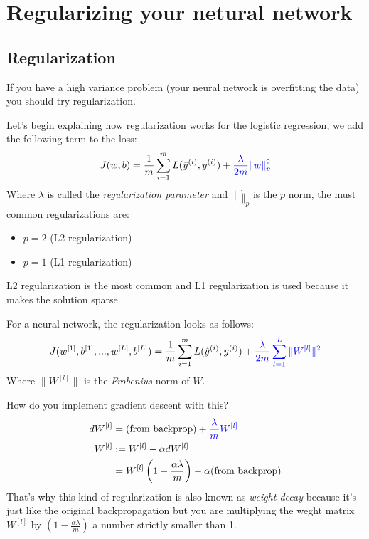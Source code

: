 \section*{Regularizing your netural network}
\subsection*{Regularization}

If you have a high variance problem (your neural network is overfitting the data) you 
should try regularization.

Let's begin explaining how regularization works for the logistic regression, we add
the following term to the loss:
\begin{align*}
    J(w,b) = \frac{1}{m} \sum_{i=1}^m L(\hat{y}^{(i)},y^{(i)}) + \color{blue} \frac{\lambda}{2m} \|w\|_p^2
\end{align*}
Where $\lambda$ is called the \textit{regularization parameter} and $\|\dot\|_p$ is the
$p$ norm, the must common regularizations are:
\begin{itemize}
    \item $p=2$ (L2 regularization)
    \item $p=1$ (L1 regularization)
\end{itemize}
L2 regularization is the most common and L1 regularization is used because it makes
the solution sparse.

For a neural network, the regularization looks as follows:
\begin{align*}
    J(w^{[1]},b^{[1]},..., w^{[L]}, b^{[L]}) = \frac{1}{m} \sum_{i=1}^m L(\hat{y}^{(i)},y^{(i)}) + \color{blue} \frac{\lambda}{2m} \sum_{l=1}^L\|W^{[l]}\|^2
\end{align*}
Where $\|W^{[l]}\|$ is the \textit{Frobenius} norm of $W$.

How do you implement gradient descent with this?
\begin{align*}
    dW^{[l]} &= \text{(from backprop)} + \color{blue} \frac{\lambda}{m}W^{[l]} \\
    W^{[l]} &:= W^{[l]} - \alpha dW^{[l]}  \\
    &= W^{[l]}\left(1 - \frac{\alpha \lambda}{m}\right) - \alpha(\text{from backprop})
\end{align*}
That's why this kind of regularization is also known as \textit{weight decay} because
it's just like the original backpropagation but you are multiplying the weght matrix
$W^{[l]}$  by $\left(1 - \frac{\alpha \lambda}{m}\right)$ a number strictly smaller than 
1.

